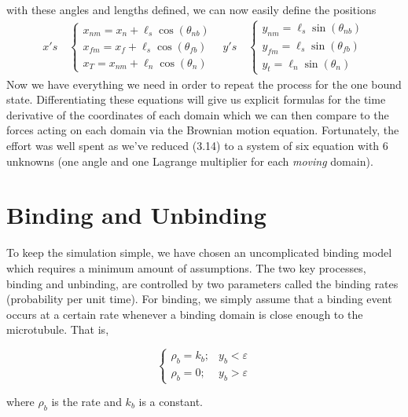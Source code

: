 	   	with these angles and lengths defined, we can now easily define the positions 
	   		\begin{align}
	   	{x}'s \quad \begin{cases}
	   	{x}_{nm} = x_n+\ell_s\cos(\theta_{nb}) \\
	   	{x}_{fm} = x_f+\ell_s\cos(\theta_{fb}) \\
	   	{x}_{T} = x_{nm}+\ell_n\cos(\theta_n) 
	   	\end{cases} &
	   	{y}'s \quad \begin{cases}
	   	{y}_{nm} = \ell_s\sin(\theta_{nb}) \\
	   	{y}_{fm} = \ell_s\sin(\theta_{fb}) \\
	   	{y}_{t} = \ell_n\sin(\theta_n) 
	   	\end{cases} 
	   	\end{align}
		Now we have everything we need in order to repeat the process for the one bound state. Differentiating these equations will give us explicit formulas for the time derivative of the coordinates of each domain which we can then compare to the forces acting on each domain via the Brownian motion equation. Fortunately, the effort was well spent as we've reduced (3.14) to a system of six equation with 6 unknowns (one angle and one Lagrange multiplier for each \textit{moving} domain). 
		 
	\section{Binding and Unbinding}
	To keep the simulation simple, we have chosen an uncomplicated binding model which requires a minimum amount of assumptions. The two key processes, binding and unbinding, are controlled by two parameters called the binding rates (probability per unit time). For binding, we simply assume that a binding event occurs at a certain rate whenever a binding domain is close enough to the microtubule. That is, 
	
	\begin{equation}
	\begin{cases}
		\rho_{b} = k_b; & y_b < \varepsilon \\ 
		\rho_{b} = 0; & y_b > \varepsilon
	\end{cases}
	\end{equation}
	
	where $\rho_b$ is the rate and $k_b$ is a constant. \\
	
